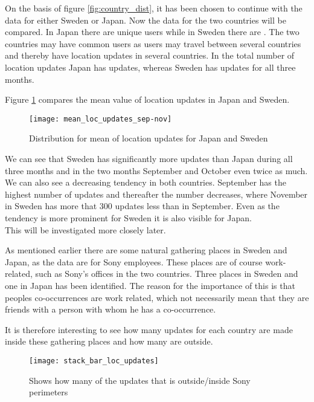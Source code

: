 On the basis of figure \ref{fig:country_dist}, it has been chosen to continue with the data for either Sweden or Japan. Now the data for the two countries will be compared. 
In Japan there are \numberUsersJapan{} unique users while in Sweden there are \numberUsersSweden{}. The two countries may have common users as users may travel between several countries and thereby have location updates in several countries.  
In the total number of location updates Japan has \locUpdatesJapan{} updates, whereas Sweden has \locUpdatesSweden{} updates for all three months. 

Figure \ref{fig:mean_loc_updates_sep-nov} compares the mean value of location updates in Japan and Sweden. 

\begin{figure}[H]
    \hspace*{-2.2cm}
    \centering
    \texttt{[image: mean\_loc\_updates\_sep-nov]}
    \caption{Distribution for mean of location updates for Japan and Sweden}
    \label{fig:mean_loc_updates_sep-nov}
\end{figure}


We can see that Sweden has significantly more updates than Japan during all three months and in the two months September and October even twice as much. We can also see a decreasing tendency in both countries. September has the highest number of updates and thereafter the number decreases, where November in Sweden has more that 300 updates less than in September. Even as the tendency is more prominent for Sweden it is also visible for Japan.  \\
This will be investigated more closely later.  


As mentioned earlier there are some natural gathering places in Sweden and Japan, as the data are for Sony employees. These places are of course work-related, such as Sony's offices in the two countries. Three places in Sweden and one in Japan has been identified. The reason for the importance of this is that peoples co-occurrences are work related, which not necessarily mean that they are friends with a person with whom he has a co-occurrence. 

It is therefore interesting to see how many updates for each country are made inside these gathering places and how many are outside.  

\begin{figure}[H]
    \hspace*{-2.2cm}
    \centering
    \texttt{[image: stack\_bar\_loc\_updates]}
    \caption{Shows how many of the updates that is outside/inside Sony perimeters}
    \label{fig:hq_stack_bar}
\end{figure}

